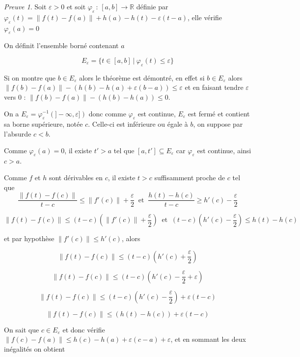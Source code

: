 \documentclass[]{article}
\theoremstyle{remark}
\newtheorem{myproof}{Preuve}
\theoremstyle{definition}
\newcommand{\funcshort}[3]{
#1 \, : \, #2 \longrightarrow #3
}
\begin{document}
\begin{myproof}
	Soit $\varepsilon > 0$ et soit $\funcshort{\varphi_\varepsilon}{[a, b]}{\mathbb{R}}$ définie par $\varphi_\varepsilon(t) = \|f(t) - f(a)\| + h(a) - h(t) - \varepsilon (t-a)$, elle vérifie $\varphi_\varepsilon(a) = 0$
	
	On définit l'ensemble borné contenant $a$
	
	$$E_\varepsilon = \{t \in [a, b] ~ | ~ \varphi_\varepsilon(t) \leqslant \varepsilon\}$$
	
	Si on montre que $b \in E_\varepsilon$ alors le théorème est démontré, en effet si $b \in E_\varepsilon$ alors $\|f(b) - f(a)\| - (h(b) - h(a) + \varepsilon(b-a)) \leqslant \varepsilon$ et en faisant tendre $\varepsilon$ vers 0 : $\|f(b) - f(a)\| - (h(b) - h(a)) \leqslant 0$.
	
	On a $E_\varepsilon = \varphi_\varepsilon^{-1}\left(]-\infty, \varepsilon]\right)$ donc comme $\varphi_\varepsilon$ est continue, $E_\varepsilon$ est fermé et contient sa borne supérieure, notée $c$. Celle-ci est inférieure ou égale à $b$, on suppose par l'absurde $c < b$.
	
	Comme $\varphi_\varepsilon(a) = 0$, il existe $t' > a$ tel que $[a, t'] \subseteq E_\varepsilon$ car $\varphi_\varepsilon$ est continue, ainsi $c > a$.
	
	Comme $f$ et $h$ sont dérivables en $c$, il existe $t > c$ suffisamment proche de $c$ tel que $$\frac{\|f(t) - f(c)\|}{t - c} \leqslant \|f'(c)\| + \frac{\varepsilon}{2} ~ \text{ et } ~ \frac{h(t) - h(c)}{t - c} \geqslant h'(c) - \frac{\varepsilon}{2}$$
	
	$$\|f(t) - f(c)\| \leqslant (t-c) \left(\|f'(c)\| + \frac{\varepsilon}{2}\right) ~ \text{ et } ~ (t-c)\left(h'(c) - \frac{\varepsilon}{2}\right) \leqslant h(t) - h(c)$$
	
	et par hypothèse $\|f'(c)\| \leqslant h'(c)$, alors
	
	$$\|f(t) - f(c)\| \leqslant (t-c)\left(h'(c) + \frac{\varepsilon}{2}\right)$$
	
	$$\|f(t) - f(c)\| \leqslant (t-c)\left(h'(c) - \frac{\varepsilon}{2} + \varepsilon\right)$$
	
	$$\|f(t) - f(c)\| \leqslant (t-c)\left(h'(c) - \frac{\varepsilon}{2}\right) + \varepsilon(t - c)$$
	
	$$\|f(t) - f(c)\| \leqslant (h(t) - h(c)) + \varepsilon(t - c)$$
	
	On sait que $c \in E{_\varepsilon}$ et donc vérifie $\|f(c)-f(a)\| \leqslant h(c) - h(a) + \varepsilon(c-a) + \varepsilon$, et en sommant les deux inégalités on obtient
	

\end{myproof}
\end{document}
